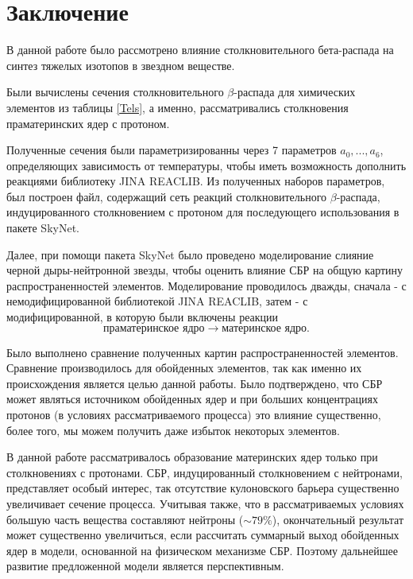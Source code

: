 \documentclass[14pt, a4paper]{article}
\begin{document}
\section*{\centering Заключение}
В данной работе было рассмотрено влияние столкновительного бета-распада на синтез тяжелых изотопов в звездном веществе.

Были вычислены сечения столкновительного $\beta$-распада для химических элементов из таблицы \ref{Tels}, а именно, рассматривались столкновения праматеринских ядер с протоном.

Полученные сечения были параметризированны через 7 параметров $a_0, ..., a_6$, определяющих зависимость от температуры, чтобы иметь возможность дополнить реакциями библиотеку JINA REACLIB. Из полученных наборов параметров, был построен файл, содержащий сеть реакций столкновительного $\beta$-распада, индуцированного столкновением с протоном для последующего использования в пакете SkyNet.


Далее, при помощи пакета SkyNet было проведено моделирование слияние черной дыры-нейтронной звезды, чтобы оценить влияние СБР на общую картину распространенностей элементов. Моделирование проводилось дважды, сначала - с немодифицированной библиотекой JINA REACLIB, затем - с модифицированной, в которую были включены реакции $$\text{праматеринское ядро} \to \text{материнское ядро}.$$

Было выполнено сравнение полученных картин распространенностей элементов.  Сравнение производилось для обойденных элементов, так как именно их происхождения является целью данной работы. Было подтверждено, что СБР может являться источником обойденных ядер и при больших концентрациях протонов (в условиях рассматриваемого процесса) это влияние существенно, более того, мы можем получить даже избыток некоторых элементов.

В данной работе рассматривалось образование материнских ядер только при столкновениях с протонами. 
СБР, индуцированный столкновением с нейтронами, представляет особый интерес, так отсутствие кулоновского барьера существенно увеличивает сечение процесса. Учитывая также, что в рассматриваемых условиях большую часть вещества составляют нейтроны ($\sim 79\%$), окончательный результат может существенно увеличиться, если рассчитать суммарный выход обойденных ядер в модели, основанной на физическом механизме СБР. Поэтому дальнейшее развитие предложенной модели является перспективным.
\newpage
{}


\end{document}
